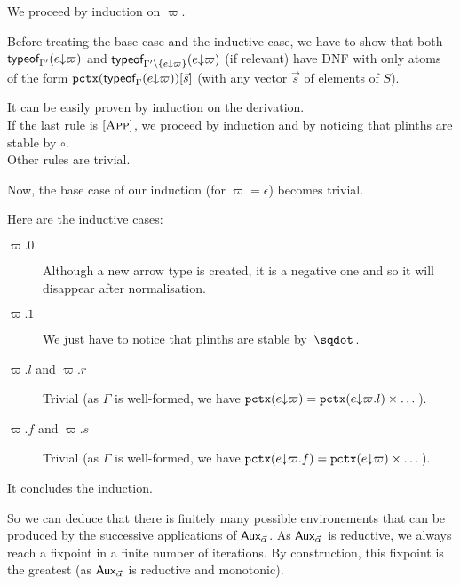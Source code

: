 \documentclass[a4paper]{article}
\theoremstyle{definition}
\begin{document}
    We proceed by induction on $\varpi$.

    Before treating the base case and the inductive case, we have to show that both $\textsf{typeof}_{\Gamma'}(e{\downarrow}\varpi)$
    and $\textsf{typeof}_{\Gamma'\setminus\{e{\downarrow}\varpi\}}(e{\downarrow}\varpi)$ (if relevant) have DNF with only atoms of the form
    $\texttt{pctx}(\textsf{typeof}_{\Gamma}(e{\downarrow}\varpi))[\vec s]$ (with any vector $\vec s$ of elements of $S$).

    It can be easily proven by induction on the derivation.\\
    If the last rule is $[\textsc{App}]$, we proceed by induction and by noticing that plinths are stable by $\circ$.\\
    Other rules are trivial.

    Now, the base case of our induction (for $\varpi=\epsilon$) becomes trivial.

    Here are the inductive cases:
    \begin{description}
      \item[$\varpi.0$] Although a new arrow type is created, it is a negative one and so it will disappear after normalisation.
      \item[$\varpi.1$] We just have to notice that plinths are stable by $\worra {} {}$.
      \item[$\varpi.l$ and $\varpi.r$] Trivial (as $\Gamma$ is well-formed, we have $\texttt{pctx}(e{\downarrow}\varpi) = \texttt{pctx}(e{\downarrow}\varpi.l)\times \dots$).
      \item[$\varpi.f$ and $\varpi.s$] Trivial (as $\Gamma$ is well-formed, we have $\texttt{pctx}(e{\downarrow}\varpi.f) = \texttt{pctx}(e{\downarrow}\varpi)\times \dots$).
    \end{description}

    It concludes the induction.

    So we can deduce that there is finitely many possible environements that can be produced by the successive applications of $\textsf{Aux}_{\vec \alpha}$.
    As $\textsf{Aux}_{\vec \alpha}$ is reductive, we always reach a fixpoint in a finite number of iterations.
    By construction, this fixpoint is the greatest (as $\textsf{Aux}_{\vec \alpha}$ is reductive and monotonic).
\end{document}
